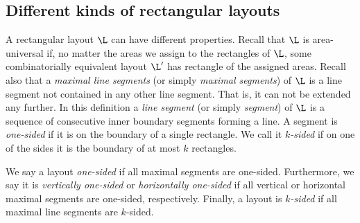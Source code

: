  \subsection{Different kinds of rectangular layouts}
   A rectangular layout $\L$ can have different properties.
   Recall that $\L$ is area-universal if, no matter the areas we assign to the rectangles of $\L$, some combinatorially equivalent layout $\L'$ has rectangle of the assigned areas.
   Recall also that a \emph{maximal line segments} (or simply \emph{maximal segments}) of $\L$ is a line segment not contained in any other line segment. That is, it can not be extended any further. In this definition a \emph{line segment} (or simply \emph{segment}) of $\L$ is a sequence of consecutive inner boundary segments forming a line.
   A segment is \emph{one-sided} if it is on the boundary of a single rectangle. We call it \emph{$k$-sided} if on one of the sides it is the boundary of at most $k$ rectangles.


   We say a layout \emph{one-sided} if all maximal segments are one-sided.
   Furthermore,  we say it is \emph{vertically one-sided} or \emph{horizontally one-sided} if all vertical or horizontal maximal segments are one-sided, respectively. Finally, a layout is \emph{$k$-sided} if all maximal line segments are $k$-sided.
